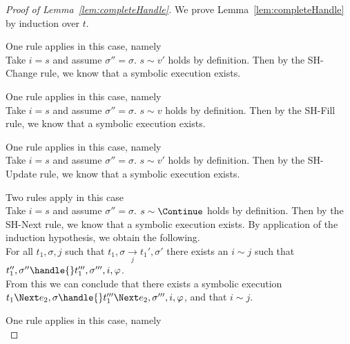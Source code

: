 \begin{proof}[Proof of Lemma~\ref{lem:completeHandle}]

  We prove Lemma~\ref{lem:completeHandle} by induction over $t$.\\

  {One rule applies in this case, namely \\
  Take $i=s$ and assume $\sigma''=\sigma$. $s\sim v'$ holds by definition.
  Then by the SH-Change rule, we know that a symbolic execution exists.

  }

  {One rule applies in this case, namely \\
  Take $i=s$ and assume $\sigma''=\sigma$. $s\sim v$ holds by definition.
  Then by the SH-Fill rule,
  we know that a symbolic execution exists.
  }

  {One rule applies in this case, namely \\
  Take $i=s$ and assume $\sigma''=\sigma$. $s\sim v'$ holds by definition.
  Then by the SH-Update rule,
  we know that a symbolic execution exists.
   }

  {Two rules apply in this case\\
    {
    Take $i=s$ and assume $\sigma''=\sigma$. $s\sim \Continue$ holds by definition.
    Then by the SH-Next rule, we know that a symbolic execution exists.
    }
    {
    By application of the induction hypothesis, we obtain the following.\\
    For all $t_1,\sigma,j$ such that $t_1,\sigma\xrightarrow[j]{}t_1',\sigma'$ there exists an $i\sim j$ such that $t_1'',\sigma''\handle{}t_1''',\sigma''',i,\phi$.\\
    From this we can conclude that there exists a symbolic execution $t_1\Next e_2,\sigma\handle{} t_1'''\Next e_2,\sigma''',i,\phi$, and that $i\sim j$.
    }
  }


  {
  One rule applies in this case, namely \\

}
\end{proof}

